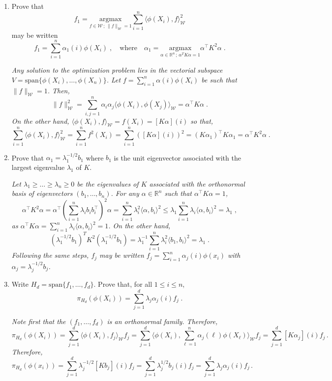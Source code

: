 \documentclass[a4paper,10pt,fleqn]{article}
\newcommand{\eqsp}{\,}
\newcommand{\rset}{\ensuremath{\mathbb{R}}}
\newcommand{\W}{\ensuremath{\mathcal{W}}}
\newcommand{\1}{\ensuremath{\mathbbm{1}}}
\newcommand{\bfK}{K}
\begin{document}
\begin{enumerate}
\item Prove that
$$
f_1 =  \underset{f\in \W\,;\,\|f\|_{\W}=1}{\mathrm{argmax}} \sum_{i=1}^n\langle \phi(X_i),f\rangle_\W^2
$$
may be written
$$
f_1 = \sum_{i=1}^n \alpha_1(i) \phi(X_i)\;,\quad\mbox{where}\quad \alpha_1 =  \underset{\alpha\in \rset^n\,;\, \alpha^T \bfK\alpha=1}{\mathrm{argmax}}\alpha^\top\bfK^2\alpha\;.
$$

\vspace{.2cm}

{\em
Any solution to the optimization problem lies in the vectorial subspace $V = \mathrm{span}\{\phi(X_i), \ldots,\phi(X_n)\}$.
Let $f = \sum_{i=1}^n \alpha(i)\phi(X_i)$ be such that $\|f\|_{\W}=1$. Then,
$$
\|f\|_{\W}^2 = \sum_{i,j=1}^n \alpha_i\alpha_j \langle \phi(X_i),\phi(X_j)\rangle_\W = \alpha^\top \bfK \alpha\;.
$$
On the other hand, $\langle \phi(X_i),f\rangle_\W = f(X_i) = [\bfK\alpha](i)$ so that,
$$
\sum_{i=1}^n\langle \phi(X_i),f\rangle_\W^2 = \sum_{i=1}^nf^2(X_i) = \sum_{i=1}^n  \left([\bfK\alpha](i)\right)^2 = (\bfK\alpha_1)^\top\bfK\alpha_1 = \alpha^\top \bfK^2 \alpha\;.
$$
}
\item Prove that $\alpha_1 = \lambda_1^{-1/2}b_1$ where $b_1$ is the unit eigenvector associated with the largest eigenvalue $\lambda_1$ of $\bfK$.

\vspace{.2cm}

{\em
Let $\lambda_1\geqslant\ldots\geqslant \lambda_n\ge 0$ be the eigenvalues of $\bfK$ associated with the orthonormal basis of eigenvectors $(b_1,\ldots,b_n)$. For any $\alpha\in\rset^n$ such that $\alpha^\top \bfK\alpha=1$,
$$
\alpha^\top \bfK^2 \alpha = \alpha^\top\left(\sum_{i=1}^n\lambda_i b_ib^\top_i\right)^2 \alpha = \sum_{i=1}^n \lambda_i^2 \langle \alpha,b_i\rangle^2 \leqslant \lambda_1\sum_{i=1}^n \lambda_i\langle \alpha,b_i\rangle^2= \lambda_1\;,
$$
as $\alpha^\top \bfK\alpha = \sum_{i=1}^n \lambda_i\langle \alpha,b_i\rangle^2 = 1$. On the other hand,
$$
\left(\lambda_1^{-1/2}b_1\right)^T \bfK^2 \left(\lambda_1^{-1/2}b_1\right) = \lambda_1^{-1}\sum_{i=1}^n \lambda_i^2 \langle b_1,b_i\rangle^2 = \lambda_1\;.
$$
Following the same steps, $f_j$ may be written $f_j = \sum_{i=1}^n \alpha_j(i)\phi(x_i)$ with $\alpha_j = \lambda^{-1/2}_jb_j$.
}
\item Write $H_d = \mathrm{span}\{f_1,\ldots,f_d\}$. Prove that, for all $1\leqslant i\leqslant n$,
$$
\pi_{H_d}(\phi(X_i)) = \sum_{j=1}^d \lambda_{j}\alpha_j(i)f_j\;.
$$

\vspace{.2cm}

{\em
Note first that the $(f_1,\ldots,f_d)$ is an orthonormal family. Therefore,
$$
\pi_{H_d}(\phi(X_i)) = \sum_{j=1}^d \langle \phi(X_i),f_j\rangle_{\W} f_j = \sum_{j=1}^d \langle \phi(X_i), \sum_{\ell=1}^n \alpha_j(\ell)\phi(X_{\ell})\rangle_{\W} f_j= \sum_{j=1}^d [\bfK\alpha_j](i)f_j\eqsp.
$$
Therefore,
$$
\pi_{H_d}(\phi(x_i)) = \sum_{j=1}^d \lambda^{-1/2}_j[\bfK b_j](i)f_j = \sum_{j=1}^d \lambda^{1/2}_jb_j(i)f_j =  \sum_{j=1}^d \lambda_{j}\alpha_j(i)f_j\eqsp.
$$
}
\end{enumerate}
\end{document}
